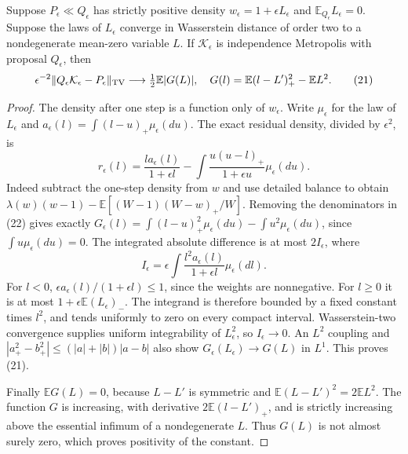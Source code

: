 \documentclass[11pt]{article}
\newcommand{\E}{\mathbb E}\newcommand{\R}{\mathbb R}
\begin{document}
\begin{lemma}\label{lem:one-step}
Suppose $P_\epsilon\ll Q_\epsilon$ has strictly positive density
$w_\epsilon=1+\epsilon L_\epsilon$ and $\E_{Q_\epsilon}L_\epsilon=0$.
Suppose the laws of $L_\epsilon$ converge in Wasserstein distance of
order two to a nondegenerate mean-zero variable $L$. If $\mathcal K_\epsilon$
is independence Metropolis with proposal $Q_\epsilon$, then
\[
 \epsilon^{-2}\|Q_\epsilon\mathcal K_\epsilon-P_\epsilon\|_{\TV}
 \longrightarrow \tfrac12\E|G(L)|,
 \quad G(l)=\E(l-L')_+^2-\E L^2.                        \tag{21}
\]
\end{lemma}
\begin{proof}
The density after one step is a function only of $w_\epsilon$. Write
$\mu_\epsilon$ for the law of $L_\epsilon$ and
$a_\epsilon(l)=\int(l-u)_+\mu_\epsilon(du)$. The exact residual density,
divided by $\epsilon^2$, is
\[
 r_\epsilon(l)=\frac{l a_\epsilon(l)}{1+\epsilon l}
       -\int\frac{u(u-l)_+}{1+\epsilon u}\mu_\epsilon(du). \tag{22}
\]
Indeed subtract the one-step density from $w$ and use detailed balance
to obtain $\lambda(w)(w-1)-\E[(W-1)(W-w)_+/W]$.
Removing the denominators in (22) gives exactly
$G_\epsilon(l)=\int(l-u)_+^2\mu_\epsilon(du)-\int u^2\mu_\epsilon(du)$,
since $\int u\mu_\epsilon(du)=0$. The integrated absolute difference is
at most $2I_\epsilon$, where
\[
 I_\epsilon=\epsilon\int
             \frac{l^2a_\epsilon(l)}{1+\epsilon l}\mu_\epsilon(dl).
\]
For $l<0$, $\epsilon a_\epsilon(l)/(1+\epsilon l)\le1$, since the
weights are nonnegative. For $l\ge0$ it is at most
$1+\epsilon\E(L_\epsilon)_-$. The integrand is therefore bounded by
a fixed constant times $l^2$, and tends uniformly to zero on every
compact interval. Wasserstein-two convergence supplies uniform
integrability of $L_\epsilon^2$, so $I_\epsilon\to0$.
An $L^2$ coupling and
$|a_+^2-b_+^2|\le(|a|+|b|)|a-b|$ also show
$G_\epsilon(L_\epsilon)\to G(L)$ in $L^1$. This proves (21).

Finally $\E G(L)=0$, because $L-L'$ is symmetric and
$\E(L-L')^2=2\E L^2$. The function $G$ is increasing, with derivative
$2\E(l-L')_+$, and is strictly increasing above the essential infimum
of a nondegenerate $L$. Thus $G(L)$ is not almost surely zero, which
proves positivity of the constant.
\end{proof}
\end{document}
